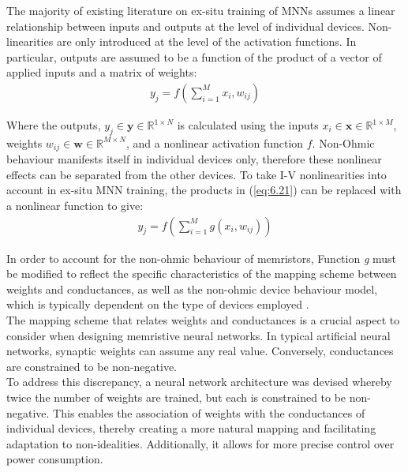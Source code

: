 \noindent The majority of existing literature on ex-situ training of MNNs assumes a linear relationship between inputs and outputs at the level of individual devices. Non-linearities are only introduced at the level of the activation functions. In particular, outputs are assumed to be a function of the product of a vector of applied inputs and a matrix of weights:
\begin{align}
y_j = f\left( \sum_{i=1}^{M} x_i, w_{ij} \right) \label{eq:6.21}
\end{align}


\noindent Where the outputs, $y_j \in \textbf{y} \in \mathbb{R}^{1 \times N}$ is calculated using the inputs $x_i \in \textbf{x} \in \mathbb{R}^{1 \times M}$, weights $w_{ij} \in \textbf{w} \in \mathbb{R}^{M \times N}$, and a nonlinear activation function $f$. Non-Ohmic behaviour manifests itself in individual devices only, therefore these nonlinear effects can be separated from the other devices. To take I-V nonlinearities into account in ex-situ MNN training, the products in (\ref{eq:6.21}) can be replaced with a nonlinear function to give:
\begin{align}
y_j = f\left( \sum_{i=1}^{M} g \left( x_i, w_{ij} \right) \right) \label{eq:6.22}
\end{align}

\noindent In order to account for the non-ohmic behaviour of memristors, Function \textit{g} must be modified to reflect the specific characteristics of the mapping scheme between weights and conductances, as well as the non-ohmic device behaviour model, which is typically dependent on the type of devices employed \cite{joksas2022nonideality}.\\

\noindent The mapping scheme that relates weights and conductances is a crucial aspect to consider when designing memristive neural networks. In typical artificial neural networks, synaptic weights can assume any real value. Conversely, conductances are constrained to be non-negative.\\

\noindent To address this discrepancy, a neural network architecture was devised whereby twice the number of weights are trained, but each is constrained to be non-negative. This enables the association of weights with the conductances of individual devices, thereby creating a more natural mapping and facilitating adaptation to non-idealities. Additionally, it allows for more precise control over power consumption.\\

